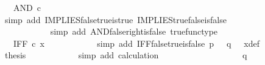 \begin{isabellebody}
\ {\isachardoublequoteopen}{\isachardot}{\kern0pt}{\isachardot}{\kern0pt}{\isachardot}{\kern0pt}\ {\isacharequal}{\kern0pt}\ AND\ {\isasymcirc}\isactrlsub c\ {\isasymlangle}{\isasymt}{\isacharcomma}{\kern0pt}\ {\isasymf}{\isasymrangle}{\isachardoublequoteclose}\isanewline
\ \ \ \ \ \ \ \ \ \ \isamarkupfalse%
\ {\isacharparenleft}{\kern0pt}simp\ add{\isacharcolon}{\kern0pt}\ IMPLIES{\isacharunderscore}{\kern0pt}false{\isacharunderscore}{\kern0pt}true{\isacharunderscore}{\kern0pt}is{\isacharunderscore}{\kern0pt}true\ IMPLIES{\isacharunderscore}{\kern0pt}true{\isacharunderscore}{\kern0pt}false{\isacharunderscore}{\kern0pt}is{\isacharunderscore}{\kern0pt}false{\isacharparenright}{\kern0pt}\isanewline
\ \ \ \ \ \ \ \ \isamarkupfalse%
\ \isamarkupfalse%
\ {\isachardoublequoteopen}{\isachardot}{\kern0pt}{\isachardot}{\kern0pt}{\isachardot}{\kern0pt}\ {\isacharequal}{\kern0pt}\ {\isasymf}{\isachardoublequoteclose}\isanewline
\ \ \ \ \ \ \ \ \ \ \isamarkupfalse%
\ {\isacharparenleft}{\kern0pt}simp\ add{\isacharcolon}{\kern0pt}\ AND{\isacharunderscore}{\kern0pt}false{\isacharunderscore}{\kern0pt}right{\isacharunderscore}{\kern0pt}is{\isacharunderscore}{\kern0pt}false\ true{\isacharunderscore}{\kern0pt}func{\isacharunderscore}{\kern0pt}type{\isacharparenright}{\kern0pt}\isanewline
\ \ \ \ \ \ \ \ \isamarkupfalse%
\ \isamarkupfalse%
\ {\isachardoublequoteopen}{\isachardot}{\kern0pt}{\isachardot}{\kern0pt}{\isachardot}{\kern0pt}\ {\isacharequal}{\kern0pt}\ IFF\ {\isasymcirc}\isactrlsub c\ x{\isachardoublequoteclose}\isanewline
\ \ \ \ \ \ \ \ \ \ \isamarkupfalse%
\ {\isacharparenleft}{\kern0pt}simp\ add{\isacharcolon}{\kern0pt}\ IFF{\isacharunderscore}{\kern0pt}false{\isacharunderscore}{\kern0pt}true{\isacharunderscore}{\kern0pt}is{\isacharunderscore}{\kern0pt}false\ {\isacartoucheopen}p\ {\isacharequal}{\kern0pt}\ {\isasymf}{\isacartoucheclose}\ {\isacartoucheopen}q\ {\isacharequal}{\kern0pt}\ {\isasymt}{\isacartoucheclose}\ x{\isacharunderscore}{\kern0pt}def{\isacharparenright}{\kern0pt}\isanewline
\ \ \ \ \ \ \ \ \isamarkupfalse%
\ \isamarkupfalse%
\ {\isacharquery}{\kern0pt}thesis\isanewline
\ \ \ \ \ \ \ \ \ \ \isamarkupfalse%
\ {\isacharparenleft}{\kern0pt}simp\ add{\isacharcolon}{\kern0pt}\ calculation{\isacharparenright}{\kern0pt}\isanewline
\ \ \ \ \ \ \isamarkupfalse%
\isanewline
\ \ \ \ \isamarkupfalse%
\isanewline
\ \ \ \ \ \ \isamarkupfalse%
\ {\isachardoublequoteopen}q\ {\isasymnoteq}\ {\isasymt}{\isachardoublequoteclose}\isanewline

\end{isabellebody}
